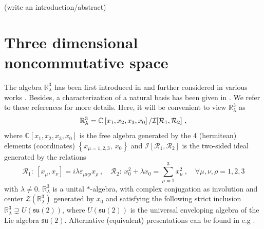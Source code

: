 \documentclass[11pt]{book}
\newcommand{\Ical}{\mathcal{I}}
\newcommand{\Rcal}{\mathcal{R}}
\newcommand{\Zcal}{\mathcal{Z}}
\newcommand{\Cbb}{\mathbb{C}}
\newcommand{\Rbb}{\mathbb{R}}
\theoremstyle{break}
\begin{document}
\bigskip


(write an introduction/abstract)


\section*{Three dimensional noncommutative space}


The algebra $\Rbb^3_\lambda$ has been first introduced in \cite{hammou_coherent_2002} and further considered in various works \cite{gracia-bondia_infinitely_2002,vitale_noncommutative_2013,gere_quantum_2014}. Besides, a characterization of a natural basis has been given in \cite{vitale_noncommutative_2013}. We refer to these references for more details. Here, it will be convenient to view $\mathbb{R}^3_\lambda$ as \cite{vitale_noncommutative_2013,gere_quantum_2014}
%
\begin{equation*}
\Rbb^3_\lambda = \Cbb\left[x_1,x_2,x_3,x_0\right]/{\mathcal{I}}[{\mathcal{R}}_1,{\cal{R}}_2] \ , 
\end{equation*}
%
where $\Cbb\left[x_1,x_2,x_3,x_0\right]$ is the free algebra generated by the 4 (hermitean) elements (coordinates) $\left\{x_{\mu=1,2,3},\ x_0\right\}$ and $\Ical\left[\Rcal_1,\Rcal_2\right]$ is the two-sided ideal generated by the relations
%
\begin{equation*}
\Rcal_1: \ [x_\mu,x_\nu] = i \lambda \varepsilon_{\mu\nu\rho} x_\rho \ , \quad
\Rcal_2: \ x_0^2 + \lambda x_0 = \sum_{\mu=1}^3 x_\mu^2 \ , \quad
\forall \mu,\nu,\rho=1,2,3
\end{equation*}
%
with $\lambda\ne0$. $\mathbb{R}^3_\lambda$ is a unital $*$-algebra, with complex conjugation as involution and center $\Zcal(\Rbb^3_\lambda)$ generated by $x_0$ and satisfying the following strict inclusion $\mathbb{R}^3_\lambda\supsetneq U(\mathfrak{su}(2))$, where $U(\mathfrak{su}(2))$ is the universal enveloping algebra of the Lie algebra ${\mathfrak{su}}(2)$. Alternative (equivalent) presentations can be found in e.g \cite{gracia-bondia_infinitely_2002,vitale_noncommutative_2013,gere_quantum_2014}.


\bigskip
\end{document}
